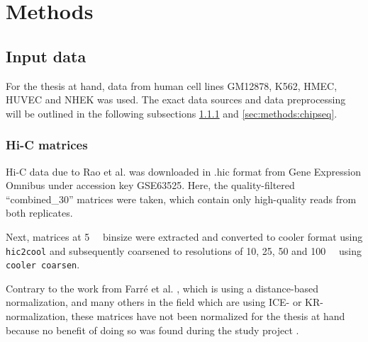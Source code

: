 \section{Methods}

\subsection{Input data}
For the thesis at hand, data from human cell lines GM12878, K562, HMEC, HUVEC and NHEK was used.
The exact data sources and data preprocessing will be outlined in the following subsections \ref{sec:methods:hicMatrices} and \ref{sec:methods:chipseq}.


\subsubsection{Hi-C matrices} \label{sec:methods:hicMatrices}
Hi-C data due to Rao et al. \cite{Rao2014} was downloaded 
in .hic format from Gene Expression Omnibus under accession key GSE63525.
Here, the quality-filtered ``combined\_30'' matrices were taken, which contain only high-quality reads from 
both replicates.

Next, matrices at \SI{5}{\kilo\bp} binsize were extracted and converted to cooler format using \texttt{hic2cool}
and subsequently coarsened to resolutions of 10, 25, 50 and \SI{100}{\kilo\bp} using \texttt{cooler coarsen}.

Contrary to the work from Farr\'e et al. \cite{Farre2018a}, which is using a distance-based normalization,
and many others in the field which are using ICE- or KR-normalization, 
these matrices have not been normalized for the thesis at hand
because no benefit of doing so was found during the study project \cite{Krauth2020}.

